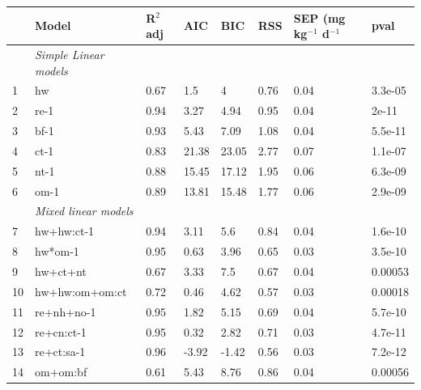 \documentclass[10pt,twoside,dutch,english]{report}
\begin{document}
\begin{appendices}
\begin{table}[H]
		\begin{tabu} to \textwidth{X[1,l]X[3,l]X[1,r]X[1,r]X[1,r]X[1,r]X[1,r]X[1,r]}
			\toprule \rowfont{\bfseries}
 & Model & R$^2$adj & AIC & BIC & RSS & SEP (mg kg$^{-1}$ d$^{-1}$& pval \\ 
 \midrule
&\textit{Simple Linear models}& & & & & & \\
1 & hw & 0.67 & 1.5 & 4 & 0.76 & 0.04 & 3.3e-05 \\ 
2 & re-1 & 0.94 & 3.27 & 4.94 & 0.95 &0.04  & 2e-11 \\ 
3 & bf-1 & 0.93 & 5.43 & 7.09 & 1.08 & 0.04 & 5.5e-11 \\ 
4 & ct-1 & 0.83 & 21.38 & 23.05 & 2.77 & 0.07 & 1.1e-07 \\ 
5 & nt-1 & 0.88 & 15.45 & 17.12 & 1.95 & 0.06 & 6.3e-09 \\ 
6 & om-1 & 0.89 & 13.81 & 15.48 & 1.77 & 0.06 & 2.9e-09 \\   \addlinespace[0.5cm]
&\textit{Mixed linear models}& & & & & & \\
 7 & hw+hw:ct-1 & 0.94 & 3.11 & 5.6 & 0.84 & 0.04 & 1.6e-10 \\ 
 8 & hw*om-1 & 0.95 & 0.63 & 3.96 & 0.65 & 0.03 & 3.5e-10 \\ 
 9 & hw+ct+nt & 0.67 & 3.33 & 7.5 & 0.67 & 0.04 & 0.00053 \\ 
 10 & hw+hw:om+om:ct & 0.72 & 0.46 & 4.62 & 0.57 & 0.03 & 0.00018 \\ 
 11 & re+nh+no-1 & 0.95 & 1.82 & 5.15 & 0.69 & 0.04 & 5.7e-10 \\ 
 12 & re+cn:ct-1 & 0.95 & 0.32 & 2.82 & 0.71 & 0.03 & 4.7e-11 \\ 
 13 & re+ct:sa-1 & 0.96 & -3.92 & -1.42 & 0.56 & 0.03 & 7.2e-12 \\ 
 14 & om+om:bf & 0.61 & 5.43 & 8.76 & 0.86 & 0.04 & 0.00056 \\
\bottomrule
			
		\end{tabu}
		\label{tab: results_mods}
	\end{table}
    
    

\end{appendices}
\end{document}

